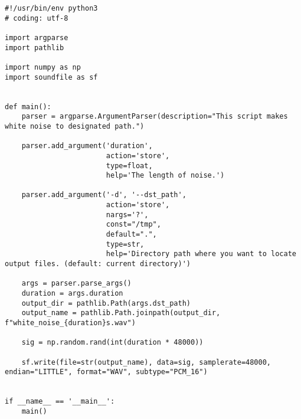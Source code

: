 \begin{lstlisting}[caption=generate\_white\_noise\_as\_wav.py,label=generate\_white\_noise\_as\_wav.py]
#!/usr/bin/env python3
# coding: utf-8

import argparse
import pathlib

import numpy as np
import soundfile as sf


def main():
    parser = argparse.ArgumentParser(description="This script makes white noise to designated path.")

    parser.add_argument('duration',
                        action='store',
                        type=float,
                        help='The length of noise.')

    parser.add_argument('-d', '--dst_path',
                        action='store',
                        nargs='?',
                        const="/tmp",
                        default=".",
                        type=str,
                        help='Directory path where you want to locate output files. (default: current directory)')

    args = parser.parse_args()
    duration = args.duration
    output_dir = pathlib.Path(args.dst_path)
    output_name = pathlib.Path.joinpath(output_dir, f"white_noise_{duration}s.wav")

    sig = np.random.rand(int(duration * 48000))

    sf.write(file=str(output_name), data=sig, samplerate=48000, endian="LITTLE", format="WAV", subtype="PCM_16")


if __name__ == '__main__':
    main()
\end{lstlisting}

